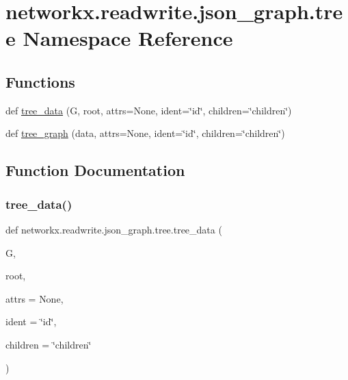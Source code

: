 \hypertarget{namespacenetworkx_1_1readwrite_1_1json__graph_1_1tree}{}\section{networkx.\+readwrite.\+json\+\_\+graph.\+tree Namespace Reference}
\label{namespacenetworkx_1_1readwrite_1_1json__graph_1_1tree}
\subsection*{Functions}
\begin{DoxyCompactItemize}
\item 
def \hyperlink{namespacenetworkx_1_1readwrite_1_1json__graph_1_1tree_af98ef67adaa8ae409fc008e8c84425e1}{tree\+\_\+data} (G, root, attrs=None, ident=\char`\"{}id\char`\"{}, children=\char`\"{}children\char`\"{})
\item 
def \hyperlink{namespacenetworkx_1_1readwrite_1_1json__graph_1_1tree_aef119a559fb1947b2d159beabb83001e}{tree\+\_\+graph} (data, attrs=None, ident=\char`\"{}id\char`\"{}, children=\char`\"{}children\char`\"{})
\end{DoxyCompactItemize}


\subsection{Function Documentation}
\mbox{\label{namespacenetworkx_1_1readwrite_1_1json__graph_1_1tree_af98ef67adaa8ae409fc008e8c84425e1}} 
\subsubsection{\texorpdfstring{tree\+\_\+data()}{tree\_data()}}
{\footnotesize\ttfamily def networkx.\+readwrite.\+json\+\_\+graph.\+tree.\+tree\+\_\+data (\begin{DoxyParamCaption}\item[{}]{G,  }\item[{}]{root,  }\item[{}]{attrs = {\ttfamily None},  }\item[{}]{ident = {\ttfamily \char`\"{}id\char`\"{}},  }\item[{}]{children = {\ttfamily \char`\"{}children\char`\"{}} }\end{DoxyParamCaption})}

